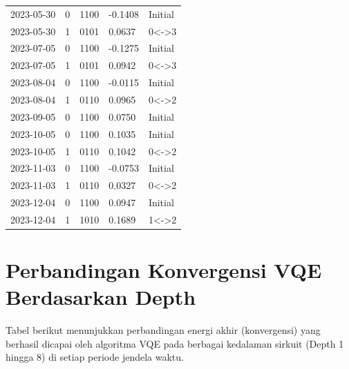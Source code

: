 \begin{footnotesize}
\begin{longtable}{lllll}
2023-05-30 & 0 & 1100 & -0.1408 & Initial \\
2023-05-30 & 1 & 0101 & 0.0637 & 0<->3 \\
2023-07-05 & 0 & 1100 & -0.1275 & Initial \\
2023-07-05 & 1 & 0101 & 0.0942 & 0<->3 \\
2023-08-04 & 0 & 1100 & -0.0115 & Initial \\
2023-08-04 & 1 & 0110 & 0.0965 & 0<->2 \\
2023-09-05 & 0 & 1100 & 0.0750 & Initial \\
2023-10-05 & 0 & 1100 & 0.1035 & Initial \\
2023-10-05 & 1 & 0110 & 0.1042 & 0<->2 \\
2023-11-03 & 0 & 1100 & -0.0753 & Initial \\
2023-11-03 & 1 & 0110 & 0.0327 & 0<->2 \\
2023-12-04 & 0 & 1100 & 0.0947 & Initial \\
2023-12-04 & 1 & 1010 & 0.1689 & 1<->2 \\
\end{longtable}
\end{footnotesize}

\section{Perbandingan Konvergensi VQE Berdasarkan Depth}

Tabel berikut menunjukkan perbandingan energi akhir (konvergensi) yang berhasil dicapai oleh algoritma VQE pada berbagai kedalaman sirkuit (Depth 1 hingga 8) di setiap periode jendela waktu. 

